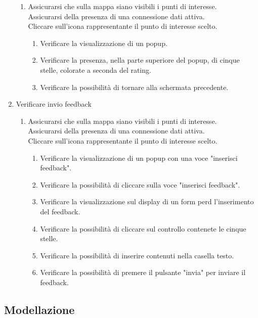 \begin{enumerate}
\begin{enumerate}
\item Assicurarsi che sulla mappa siano visibili i punti di interesse.\\
Assicurarsi della presenza di una connessione dati attiva.\\
Cliccare sull'icona rappresentante il punto di interesse scelto.
\begin{enumerate}
\item Verificare la visualizzazione di un popup.
\item Verificare la presenza, nella parte superiore del popup, di cinque stelle, colorate a seconda del rating.
\item Verificare la possibilità di tornare alla schermata precedente.
\end{enumerate}
\end{enumerate}
\item Verificare invio feedback
\begin{enumerate}
\item Assicurarsi che sulla mappa siano visibili i punti di interesse.\\
Assicurarsi della presenza di una connessione dati attiva.\\
Cliccare sull'icona rappresentante il punto di interesse scelto.
\begin{enumerate}
\item Verificare la visualizzazione di un popup con una voce "inserisci feedback".
\item Verificare la possibilità di cliccare sulla voce "inserisci feedback".
\item Verificare la visualizzazione sul display di un form perd l'inserimento del feedback.
\item Verificare la possibilità di cliccare sul controllo contenete le cinque stelle.
\item Verificare la possibilità di inserire contenuti nella casella testo.
\item Verificare la possibilità di premere il pulsante "invia" per inviare il feedback.
\end{enumerate}
\end{enumerate}
\end{enumerate}


\subsection{Modellazione}
